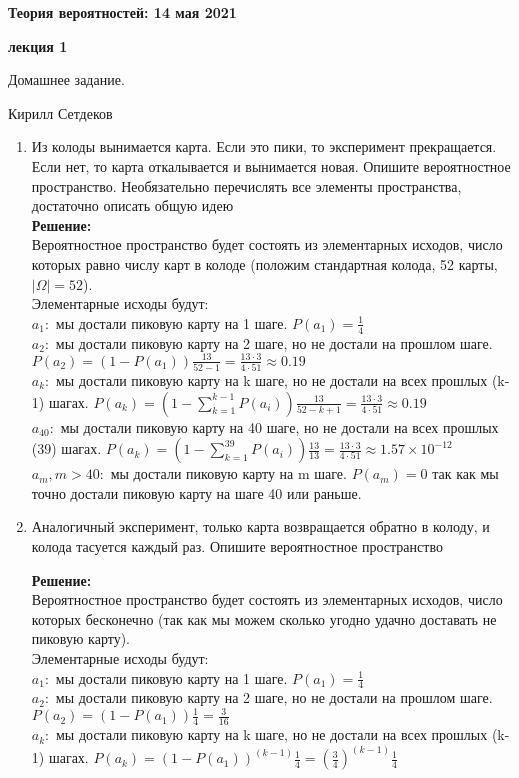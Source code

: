 \documentclass[a4paper,12pt]{article}
\newcounter{z}
\renewcommand{\date}{{\bf 14 мая 2021}}
\newcommand{\HSEhat}{
\vspace*{-0pt}
\noindent
\setcounter{z}{0}


{\bf \phantom{\date}  \large \hfill Теория вероятностей: \hfill \normalsize \date}

\vspace{5 pt}
{\bf \large \hfill  лекция 1\hfill }

\vspace{15 pt}
\centerline{ \large  Домашнее задание.}
\centerline{ \large  Кирилл Сетдеков}



\vspace*{10pt}
\setcounter{z}{0}

}
\begin{document}
\HSEhat


\begin{enumerate}

\subsection*{Задачи:}



\item Из колоды вынимается карта. Если это пики, то эксперимент прекращается. Если нет, то карта откалывается и вынимается новая. Опишите вероятностное пространство. Необязательно перечислять все элементы пространства, достаточно описать общую идею\\
\textbf{Решение:}\\
Вероятностное пространство будет состоять из элементарных исходов, число которых равно числу карт в колоде (положим стандартная колода, 52 карты, $|\Omega|=52$).\\
Элементарные исходы будут:\\
$a_1:$ мы достали пиковую карту на 1 шаге. $P(a_1)=\frac{1}{4}$\\
$a_2:$ мы достали пиковую карту на 2 шаге, но не достали на прошлом шаге. $P(a_2)=(1-P(a_1))\frac{13}{52-1}=\frac{13\cdot3}{4\cdot51} \approx 0.19$\\
$a_k:$ мы достали пиковую карту на k шаге, но не достали на всех прошлых (k-1) шагах. $P(a_k)=(1-\sum_{k=1}^{k-1}P(a_i))\frac{13}{52-k+1}=\frac{13\cdot3}{4\cdot51} \approx 0.19$\\
$a_{40}:$ мы достали пиковую карту на 40 шаге, но не достали на всех прошлых (39) шагах. $P(a_k)=(1-\sum_{k=1}^{39}P(a_i))\frac{13}{13}=\frac{13\cdot3}{4\cdot51} \approx 1.57 \times 10^{-12}$\\
$a_{m}, m>40:$ мы достали пиковую карту на m шаге. $P(a_m)=0$ так как мы точно достали пиковую карту на шаге 40 или раньше. 




\item Аналогичный эксперимент, только карта возвращается обратно в колоду, и колода тасуется каждый раз. Опишите вероятностное пространство

\textbf{Решение:}\\
Вероятностное пространство будет состоять из элементарных исходов, число которых бесконечно (так как мы можем сколько угодно удачно доставать не пиковую карту).\\
Элементарные исходы будут:\\
$a_1:$ мы достали пиковую карту на 1 шаге. $P(a_1)=\frac{1}{4}$\\
$a_2:$ мы достали пиковую карту на 2 шаге, но не достали на прошлом шаге. $P(a_2)=(1-P(a_1))\frac{1}{4}=\frac{3}{16}$\\
$a_k:$ мы достали пиковую карту на k шаге, но не достали на всех прошлых (k-1) шагах. $P(a_k)=(1-P(a_1))^{(k-1)}\frac{1}{4}=(\frac{3}{4})^{(k-1)}\frac{1}{4}$


\end{enumerate}
\end{document}
